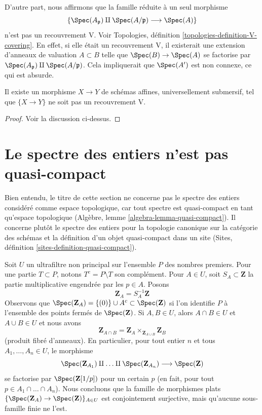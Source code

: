 \medskip\noindent
D'autre part, nous affirmons que la famille réduite à un seul morphisme
$$
\{\Spec(A_\mathfrak p) \amalg \Spec(A/\mathfrak p) \longrightarrow \Spec(A)\}
$$
n'est pas un recouvrement V. Voir
Topologies, définition \ref{topologies-definition-V-covering}.
En effet, si elle était un recouvrement V, il existerait une extension
d'anneaux de valuation $A \subset B$ telle que
$\Spec(B) \to \Spec(A)$ se factorise par
$\Spec(A_\mathfrak p) \amalg \Spec(A/\mathfrak p)$.
Cela impliquerait que $\Spec(A')$ est non connexe, ce qui est absurde.

\begin{lemma}
\label{lemma-universally-submersive-not-V}
Il existe un morphisme $X \to Y$ de schémas affines,
universellement submersif, tel que $\{X \to Y\}$
ne soit pas un recouvrement V.
\end{lemma}

\begin{proof}
Voir la discussion ci-dessus.
\end{proof}









\section{Le spectre des entiers n'est pas quasi-compact}
\label{section-canonical}

\noindent
Bien entendu, le titre de cette section ne concerne pas le spectre des entiers
considéré comme espace topologique, car tout spectre est quasi-compact
en tant qu'espace topologique
(Algèbre, lemme \ref{algebra-lemma-quasi-compact}).
Il concerne plutôt le spectre des entiers pour la topologie canonique
sur la catégorie des schémas et la définition d'un objet quasi-compact
dans un site
(Sites, définition \ref{sites-definition-quasi-compact}).

\medskip\noindent
Soit $U$ un ultrafiltre non principal sur l'ensemble $P$ des nombres premiers.
Pour une partie $T \subset P$, notons $T^c = P \setminus T$ son complément.
Pour $A \in U$, soit $S_A \subset \mathbf{Z}$ la partie multiplicative
engendrée par les $p \in A$. Posons
$$
\mathbf{Z}_A = S_A^{-1}\mathbf{Z}
$$
Observons que $\Spec(\mathbf{Z}_A) = \{(0)\} \cup A^c \subset \Spec(\mathbf{Z})$
si l'on identifie $P$ à l'ensemble des points fermés de $\Spec(\mathbf{Z})$.
Si $A, B \in U$, alors $A \cap B \in U$ et $A \cup B \in U$
et nous avons
$$
\mathbf{Z}_{A \cap B} =
\mathbf{Z}_A \times_{\mathbf{Z}_{A \cup B}} \mathbf{Z}_B
$$
(produit fibré d'anneaux). En particulier, pour tout
entier $n$ et tous $A_1, \ldots, A_n \in U$, le morphisme
$$
\Spec(\mathbf{Z}_{A_1}) \amalg \ldots \amalg \Spec(\mathbf{Z}_{A_n})
\longrightarrow \Spec(\mathbf{Z})
$$
se factorise par $\Spec(\mathbf{Z}[1/p])$ pour un certain $p$
(en fait, pour tout $p \in A_1 \cap \ldots \cap A_n$).
Nous concluons que la famille de morphismes plats
$\{\Spec(\mathbf{Z}_A) \to \Spec(\mathbf{Z})\}_{A \in U}$
est conjointement surjective, mais qu'aucune sous-famille finie ne l'est.

